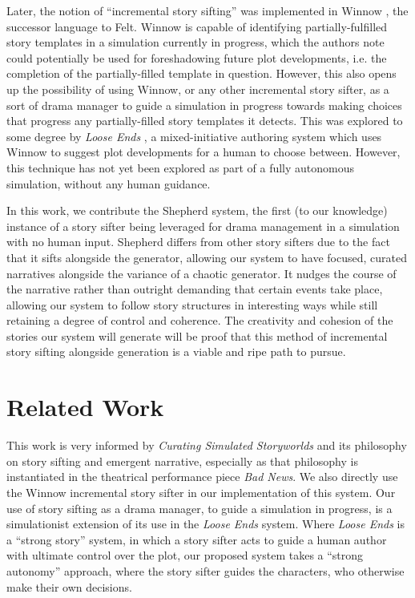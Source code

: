 \documentclass[letterpaper]{article}
\begin{document}
Later, the notion of “incremental story sifting” was implemented in Winnow
\cite{kreminski:winnow}, the successor
language to Felt. Winnow is capable of identifying partially-fulfilled story templates in
a simulation currently in progress, which the authors note could potentially be used for
foreshadowing future plot developments, i.e. the completion of the partially-filled
template in question. However, this also opens up the possibility of using Winnow, or any
other incremental story sifter, as a sort of drama manager to guide a simulation in
progress towards making choices that progress any partially-filled story templates it
detects. This was explored to some degree by \textit{Loose Ends} \cite{kreminski:loose}, a mixed-initiative authoring
system which uses Winnow to suggest plot developments for a human to choose between.
However, this technique has not yet been explored as part of a fully autonomous
simulation, without any human guidance. 

In this work, we contribute the Shepherd system, the first (to our knowledge) instance of
a story sifter being leveraged for drama management in a simulation with no human input.
Shepherd differs from other story sifters due to the fact that it sifts alongside the
generator, allowing our system to have focused, curated narratives alongside the variance
of a chaotic generator. It nudges the course of the narrative rather than outright
demanding that certain events take place, allowing our system to follow story structures
in interesting ways while still retaining a degree of control and coherence. The
creativity and cohesion of the stories our system will generate will be proof that this
method of incremental story sifting alongside generation is a viable and ripe path to
pursue.

\section{Related Work}
This work is very informed by \textit{Curating Simulated Storyworlds} \cite{ryan:curating} and its
philosophy on story sifting and emergent narrative, especially as that philosophy is
instantiated in the theatrical performance piece \textit{Bad News}. We also directly use the Winnow
incremental story sifter in our implementation of this system. Our
use of story sifting as a drama manager, to guide a simulation in progress, is a
simulationist extension of its use in the \textit{Loose Ends} system. 
Where
\textit{Loose Ends} is a “strong story” system, in which a story sifter acts to guide a human
author with ultimate control over the plot, our proposed system takes a “strong autonomy”
approach, where the story sifter guides the characters, who otherwise make their own
decisions. 
\end{document}

